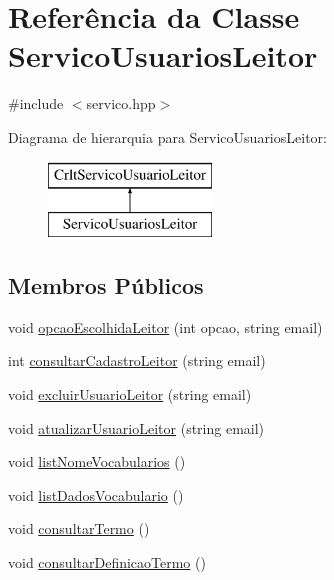 \hypertarget{class_servico_usuarios_leitor}{}\section{Referência da Classe Servico\+Usuarios\+Leitor}
\label{class_servico_usuarios_leitor}


{\ttfamily \#include $<$servico.\+hpp$>$}

Diagrama de hierarquia para Servico\+Usuarios\+Leitor\+:\begin{figure}[H]
\begin{center}
\leavevmode
\includegraphics[height=2.000000cm]{class_servico_usuarios_leitor}
\end{center}
\end{figure}
\subsection*{Membros Públicos}
\begin{DoxyCompactItemize}
\item 
void \mbox{\hyperlink{class_servico_usuarios_leitor_a9a8e9ac18739ef8e75f670236ba90c20}{opcao\+Escolhida\+Leitor}} (int opcao, string email)
\item 
int \mbox{\hyperlink{class_servico_usuarios_leitor_a8f34dddc0540f729a701d69f948ffb42}{consultar\+Cadastro\+Leitor}} (string email)
\item 
void \mbox{\hyperlink{class_servico_usuarios_leitor_adce08fccebc11dbd5f395b8a4bb23d2a}{excluir\+Usuario\+Leitor}} (string email)
\item 
void \mbox{\hyperlink{class_servico_usuarios_leitor_ad77426aecdda591b99ecbf8259a05b2d}{atualizar\+Usuario\+Leitor}} (string email)
\item 
void \mbox{\hyperlink{class_servico_usuarios_leitor_a376f7cdbdea50d9a01ce611e79d346c4}{list\+Nome\+Vocabularios}} ()
\item 
void \mbox{\hyperlink{class_servico_usuarios_leitor_a4f533d318634c95d3f756a45c7613047}{list\+Dados\+Vocabulario}} ()
\item 
void \mbox{\hyperlink{class_servico_usuarios_leitor_a79d3a1814ad33930aae0c3a74c879e92}{consultar\+Termo}} ()
\item 
void \mbox{\hyperlink{class_servico_usuarios_leitor_a89ed39e45ee1c564e1f62df7154d1b29}{consultar\+Definicao\+Termo}} ()
\end{DoxyCompactItemize}


